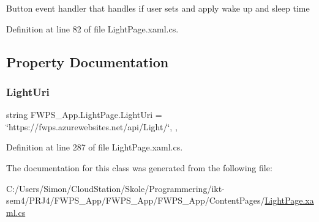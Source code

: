 Button event handler that handles if user sets and apply wake up and sleep time 

Definition at line 82 of file Light\+Page.\+xaml.\+cs.



\subsection{Property Documentation}
\mbox{\label{class_f_w_p_s___app_1_1_light_page_a716a9e5c26501a8180dddc358f418330}} 
\subsubsection{\texorpdfstring{Light\+Uri}{LightUri}}
{\footnotesize\ttfamily string F\+W\+P\+S\+\_\+\+App.\+Light\+Page.\+Light\+Uri = \char`\"{}https\+://fwps.\+azurewebsites.\+net/api/Light/\char`\"{}\hspace{0.3cm}{\ttfamily [static]}, {\ttfamily [get]}, {\ttfamily [set]}}



Definition at line 287 of file Light\+Page.\+xaml.\+cs.



The documentation for this class was generated from the following file\+:\begin{DoxyCompactItemize}
\item 
C\+:/\+Users/\+Simon/\+Cloud\+Station/\+Skole/\+Programmering/ikt-\/sem4/\+P\+R\+J4/\+F\+W\+P\+S\+\_\+\+App/\+F\+W\+P\+S\+\_\+\+App/\+F\+W\+P\+S\+\_\+\+App/\+Content\+Pages/\mbox{\hyperlink{_light_page_8xaml_8cs}{Light\+Page.\+xaml.\+cs}}\end{DoxyCompactItemize}
